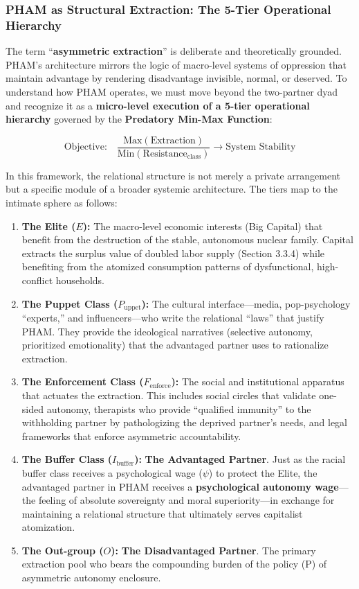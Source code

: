 \documentclass[12pt, letterpaper]{article}
\begin{document}
\subsubsection{PHAM as Structural Extraction: The 5-Tier Operational Hierarchy}

The term ``\textbf{asymmetric extraction}'' is deliberate and theoretically grounded. PHAM's architecture mirrors the logic of macro-level systems of oppression that maintain advantage by rendering disadvantage invisible, normal, or deserved. To understand how PHAM operates, we must move beyond the two-partner dyad and recognize it as a \textbf{micro-level execution of a 5-tier operational hierarchy} governed by the \textbf{Predatory Min-Max Function}:

\[
\text{Objective:} \quad \frac{\text{Max}(\text{Extraction})}{\text{Min}(\text{Resistance}_{\text{class}})} \rightarrow \text{System Stability}
\]

In this framework, the relational structure is not merely a private arrangement but a specific module of a broader systemic architecture. The tiers map to the intimate sphere as follows:

\begin{enumerate}
    \item \textbf{The Elite ($E$):} The macro-level economic interests (Big Capital) that benefit from the destruction of the stable, autonomous nuclear family. Capital extracts the surplus value of doubled labor supply (Section 3.3.4) while benefiting from the atomized consumption patterns of dysfunctional, high-conflict households.
    
    \item \textbf{The Puppet Class ($P_{\text{uppet}}$):} The cultural interface---media, pop-psychology ``experts,'' and influencers---who write the relational ``laws'' that justify PHAM. They provide the ideological narratives (selective autonomy, prioritized emotionality) that the advantaged partner uses to rationalize extraction.
    
    \item \textbf{The Enforcement Class ($F_{\text{enforce}}$):} The social and institutional apparatus that actuates the extraction. This includes social circles that validate one-sided autonomy, therapists who provide ``qualified immunity'' to the withholding partner by pathologizing the deprived partner's needs, and legal frameworks that enforce asymmetric accountability.
    
    \item \textbf{The Buffer Class ($I_{\text{buffer}}$):} \textbf{The Advantaged Partner}. Just as the racial buffer class receives a psychological wage ($\psi$) to protect the Elite, the advantaged partner in PHAM receives a \textbf{psychological autonomy wage}---the feeling of absolute sovereignty and moral superiority---in exchange for maintaining a relational structure that ultimately serves capitalist atomization.
    
    \item \textbf{The Out-group ($O$):} \textbf{The Disadvantaged Partner}. The primary extraction pool who bears the compounding burden of the policy (P) of asymmetric autonomy enclosure.
\end{enumerate}
\end{document}
